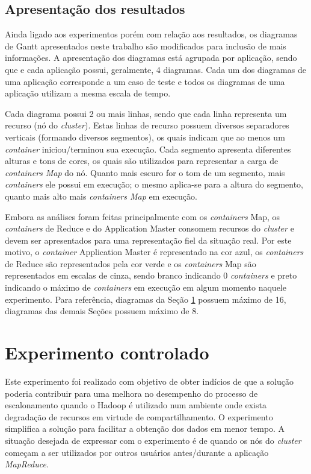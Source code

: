 \subsection{Apresentação dos resultados}
Ainda ligado aos experimentos porém com relação aos resultados, os diagramas de Gantt apresentados neste trabalho são modificados para inclusão de mais informações. A apresentação dos diagramas está agrupada por aplicação, sendo que e cada aplicação possui, geralmente, 4 diagramas. Cada um dos diagramas de uma aplicação corresponde a um caso de teste e todos os diagramas de uma aplicação utilizam a mesma escala de tempo.

Cada diagrama possui 2 ou mais linhas, sendo que cada linha representa  um recurso (nó do \textit{cluster}). Estas linhas de recurso possuem diversos separadores verticais (formando diversos segmentos), os quais indicam que ao menos um \textit{container} iniciou/terminou sua execução. Cada segmento apresenta diferentes alturas e tons de cores, os quais são utilizados para representar a carga de \textit{containers Map} do nó. Quanto mais escuro for o tom de um segmento, mais \textit{containers} ele possui em execução; o mesmo aplica-se para a altura do segmento, quanto mais alto mais \textit{containers Map} em execução.

Embora as análises foram feitas principalmente com os \textit{containers} Map, os \textit{containers} de Reduce e do Application Master consomem recursos do \textit{cluster} e devem ser apresentados para uma representação fiel da situação real. Por este motivo, o \textit{container} Application Master é representado na cor azul, os \textit{containers} de Reduce são representados pela cor verde e os \textit{containers} Map são representados em escalas de cinza, sendo branco indicando 0 \textit{containers} e preto indicando o máximo de \textit{containers} em execução em algum momento naquele experimento. Para referência, diagramas da Seção \ref{sec:expCont} possuem máximo de 16, diagramas das demais Seções possuem máximo de 8.

\section{Experimento controlado}
\label{sec:expCont}
Este experimento foi realizado com objetivo de obter indícios de que a solução poderia contribuir para uma melhora no desempenho do processo de escalonamento quando o Hadoop é utilizado num ambiente onde exista degradação de recursos em virtude de compartilhamento. O experimento simplifica a solução para facilitar a obtenção dos dados em menor tempo. A situação desejada de expressar com o experimento é de quando os nós do \textit{cluster} começam a ser utilizados por outros usuários antes/durante a aplicação \textit{MapReduce}.

